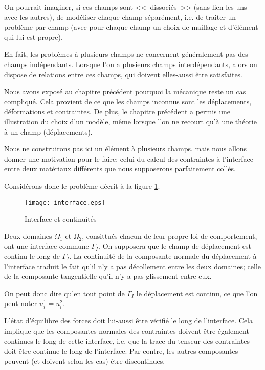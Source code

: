 On pourrait imaginer, si ces champs sont <<~dissociés~>> (sans lien les uns avec les
autres), de modéliser chaque champ séparément, i.e. de traiter un
problème par champ (avec pour chaque champ un choix de maillage et
d'élément qui lui est propre).

En fait, les problèmes à plusieurs champs ne concernent généralement
pas des champs indépendants.
Lorsque l'on a plusieurs champs interdépendants, alors on dispose de relations
entre ces champs, qui doivent elles-aussi être satisfaites.

\medskip
Nous avons exposé au chapitre précédent pourquoi la mécanique reste un cas
compliqué. Cela provient de ce que les champs inconnus sont les déplacements,
déformations et contraintes.
De plus, le chapitre précédent a permis une illustration du choix d'un modèle,
même lorsque l'on ne recourt qu'à une théorie à un champ (déplacements).

\medskip
Nous ne construirons pas ici un élément à plusieurs champs, mais nous
allons donner une motivation pour le faire: celui du calcul des contraintes à
l'interface entre deux matériaux différents que nous supposerons parfaitement
collés.

Considérons donc le problème décrit à la figure \ref{interf}.
\begin{figure}[ht]
\centering
\texttt{[image: interface.eps]}
\caption{Interface et continuités}\label{interf}
\end{figure}
Deux domaines $\Omega_1$ et $\Omega_2$, consittués chacun de leur
propre loi de comportement, ont une interface commune $\Gamma_I$.
On supposera que le champ de déplacement est continu le long de $\Gamma_I$.
La continuité de la composante normale du déplacement à l'interface traduit le
fait qu'il n'y a pas décollement entre les deux domaines; celle de la composante
tangentielle qu'il n'y a pas glissement entre eux.

On peut donc dire qu'en tout point de $\Gamma_I$ le déplacement est
continu, ce que l'on peut noter $u_i^1=u_i^2$.

\medskip
L'état d'équilibre des forces doit lui-aussi être vérifié le long de l'interface.
Cela implique que les composantes normales des contraintes doivent être également
continues le long de cette interface, i.e. que la trace du tenseur des contraintes doit
être continue le long de l'interface.
Par contre, les autres composantes peuvent (et doivent selon les cas) être
discontinues.

